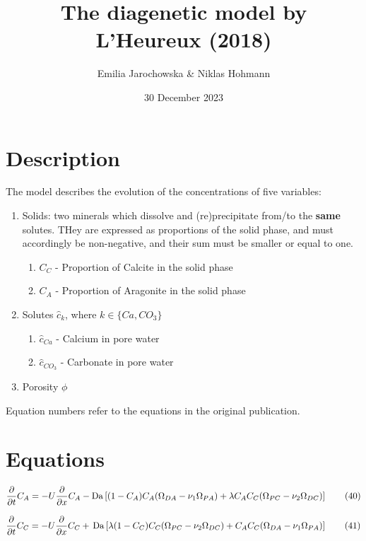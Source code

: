 \documentclass[10pt, letterpaper]{article}
\title{The diagenetic model by L'Heureux (2018)}
\author{Emilia Jarochowska & Niklas Hohmann}
\date{30 December 2023}
\begin{document}
\maketitle

\section{Description}
The model describes the evolution of the concentrations of five variables:
\begin{enumerate}
    \item Solids: two minerals which dissolve and (re)precipitate from/to the \textbf{same} solutes. THey are expressed as proportions of the solid phase, and must accordingly be non-negative, and their sum must be smaller or equal to one. 
    \begin{enumerate}
        \item $C_C$ - Proportion of Calcite in the solid phase
        \item $C_A$ - Proportion of Aragonite in the solid phase 
    \end{enumerate}
    \item Solutes $\hat{c}_k$, where $k \in \{Ca, CO_{3}\}$
    \begin{enumerate}
        \item $\hat c_{Ca}$ - Calcium in pore water
        \item $ \hat c_{CO_{3}}$ - Carbonate in pore water
    \end{enumerate}
    \item Porosity $\phi$
\end{enumerate}
Equation numbers refer to the equations in the original publication.

\section{Equations}
\begin{equation}
\frac{\partial}{\partial t} C_A = -U\frac{\partial}{\partial x} C_A - \operatorname{Da}\left[(1 - C_A)C_A (\Omega_{DA} - \nu_1 \Omega_{PA}) \\
        + \lambda C_A C_C (\Omega_{PC} - \nu_2 \Omega_{DC})\right] \tag{40}
\end{equation}

\begin{equation}
\frac{\partial}{\partial t} C_C = -U\frac{\partial}{\partial x} C_C + \\\operatorname{Da}\left[\lambda(1-C_C)C_C(\Omega_{PC} - \nu_2 \Omega_{DC}) + C_A C_C (\Omega_{DA} - \nu_1 \Omega_{PA})\right] \tag{41}
\end{equation}
\end{document}
